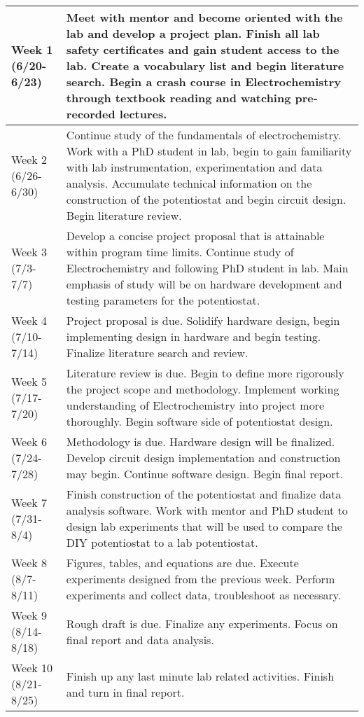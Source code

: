 \documentclass{article}
\begin{document}
  \begin{table}[H]
    \centering
    \begin{tabular}{|l|p{10cm}|}
    \hline
    Week 1 (6/20-6/23) & Meet with mentor and become oriented with the lab and develop a project plan. Finish all lab safety certificates and gain student access to the lab. Create a vocabulary list and begin literature search. Begin a crash course in Electrochemistry through textbook reading and watching pre-recorded lectures.\\
    \hline
    Week 2 (6/26-6/30) & Continue study of the fundamentals of electrochemistry. Work with a PhD student in lab, begin to gain familiarity with lab instrumentation, experimentation and data analysis. Accumulate technical information on the construction of the potentiostat and begin circuit design. Begin literature review.\\
    \hline
    Week 3 (7/3-7/7) & Develop a concise project proposal that is attainable within program time limits. Continue study of Electrochemistry and following PhD student in lab. Main emphasis of study will be on hardware development and testing parameters for the potentiostat.\\
    \hline
    Week 4 (7/10-7/14) & Project proposal is due. Solidify hardware design, begin implementing design in hardware and begin testing. Finalize literature search and review.\\
    \hline
    Week 5 (7/17-7/20) & Literature review is due. Begin to define more rigorously the project scope and methodology. Implement working understanding of Electrochemistry into project more thoroughly. Begin software side of potentiostat design.\\
    \hline
    Week 6 (7/24-7/28) & Methodology is due. Hardware design will be finalized. Develop circuit design implementation and construction may begin. Continue software design. Begin final report.\\
    \hline
    Week 7 (7/31-8/4) & Finish construction of the potentiostat and finalize data analysis software. Work with mentor and PhD student to design lab experiments that will be used to compare the DIY potentiostat to a lab potentiostat.\\
    \hline
    Week 8 (8/7-8/11) & Figures, tables, and equations are due. Execute experiments designed from the previous week. Perform experiments and collect data, troubleshoot as necessary.\\
    \hline
    Week 9 (8/14-8/18) & Rough draft is due. Finalize any experiments. Focus on final report and data analysis.\\
    \hline
    Week 10 (8/21-8/25) & Finish up any last minute lab related activities. Finish and turn in final report.\\
    \hline
    \end{tabular}
    \end{table}
\end{document}
